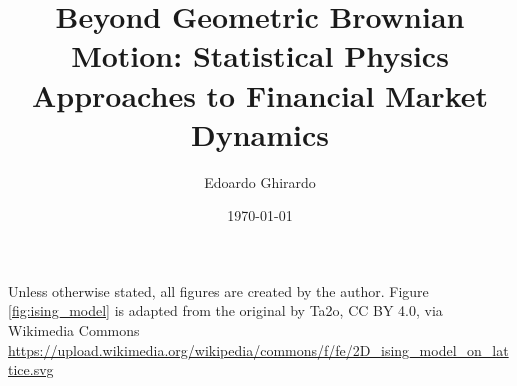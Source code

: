 \documentclass[a4paper,12pt]{report}
\title{Beyond Geometric Brownian Motion: Statistical Physics Approaches to Financial Market Dynamics}
\author{Edoardo Ghirardo}
\date{\today}
\begin{document}

\cleardoublepage %
\null\thispagestyle{empty}
\cleardoublepage %
\null\thispagestyle{empty}




\cleardoublepage %
\null\thispagestyle{empty}


\tableofcontents









Unless otherwise stated, all figures are created by the author. Figure \ref{fig:ising_model} is adapted from the original by Ta2o, CC BY 4.0, via Wikimedia Commons \url{https://upload.wikimedia.org/wikipedia/commons/f/fe/2D_ising_model_on_lattice.svg}
\end{document}

